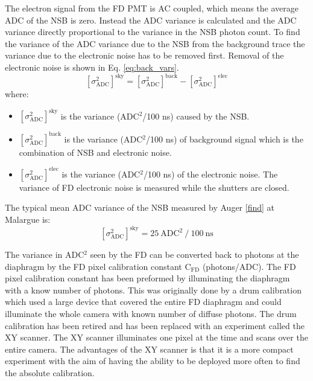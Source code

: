 The electron signal from the FD PMT is AC coupled, which means the average ADC of the NSB is zero. Instead the ADC variance is calculated and the ADC variance directly proportional to the variance in the NSB photon count. To find the variance of the ADC variance due to the NSB from the background trace the variance due to the electronic noise has to be removed first. Removal of the electronic noise is shown in Eq. \ref{eq:back_vars}. 
\begin{equation}
\left[\sigma^2_{\mathrm{ADC}}\right]^{\mathrm{sky}} = \left[\sigma^2_{\mathrm{ADC}}\right]^{\mathrm{back}} - \left[\sigma^2_{\mathrm{ADC}}\right]^{\mathrm{elec}} \label{eq:back_vars}
\end{equation} 
where:
\begin{itemize}
\item[] $\left[\sigma^2_{\mathrm{ADC}}\right]^{\mathrm{sky}}$ is the variance (ADC$^2$/100 ns) caused by the NSB.
\item[] $\left[\sigma^2_{\mathrm{ADC}}\right]^{\mathrm{back}}$ is the variance (ADC$^2$/100 ns) of background signal which is the combination of NSB and electronic noise.
\item[] $\left[\sigma^2_{\mathrm{ADC}}\right]^{\mathrm{elec}}$ is the variance (ADC$^2$/100 ns) of the electronic noise. The variance of FD electronic noise is measured while the shutters are closed.
\end{itemize}
The typical mean ADC variance of the NSB measured by Auger \ref{find} at Malargue is:
\begin{equation}
\left[\sigma^2_{\mathrm{ADC}}\right]^{\mathrm{sky}} = 25 \ \mathrm{ADC}^2 \ / \ 100 \ \mathrm{ns} \nonumber
\end{equation}

The variance in ADC$^2$ seen by the FD can be converted back to photons at the diaphragm by the FD pixel calibration constant C$_{\mathrm{FD}}$ (photons/ADC). The FD pixel calibration constant has been preformed by illuminating the diaphragm with a know number of photons. This was originally done by a drum calibration which used a large device that covered the entire FD diaphragm and could illuminate the whole camera with known number of diffuse photons. The drum calibration has been retired and has been replaced with an experiment called the XY scanner. The XY scanner illuminates one pixel at the time and scans over the entire camera. The advantages of the XY scanner is that it is a more compact experiment with the aim of having the ability to be deployed more often to find the absolute calibration.

